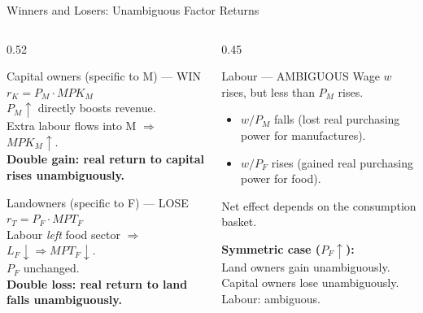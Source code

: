 \documentclass[aspectratio=169]{beamer}
\begin{document}
\begin{frame}{Winners and Losers: Unambiguous Factor Returns}
\begin{columns}[T]
\begin{column}{0.52\textwidth}
\begin{block}{Capital owners (specific to M) --- WIN}
\small$r_K = P_M\cdot MPK_M$\\
$P_M\uparrow$ directly boosts revenue.\\
Extra labour flows into M $\Rightarrow$ $MPK_M\uparrow$.\\
\textbf{Double gain: real return to capital rises
unambiguously.}
\end{block}
\vspace{0.3em}
\begin{block}{Landowners (specific to F) --- LOSE}
\small$r_T = P_F\cdot MPT_F$\\
Labour \emph{left} food sector $\Rightarrow$
$L_F\downarrow\Rightarrow MPT_F\downarrow$.\\
$P_F$ unchanged.\\
\textbf{Double loss: real return to land falls
unambiguously.}
\end{block}
\end{column}
\begin{column}{0.45\textwidth}
\begin{alertblock}{Labour --- AMBIGUOUS}
\small Wage $w$ rises, but less than $P_M$ rises.
\begin{itemize}\small
  \item $w/P_M$ falls (lost real purchasing power for
        manufactures).
  \item $w/P_F$ rises (gained real purchasing power for
        food).
\end{itemize}
Net effect depends on the consumption basket.
\end{alertblock}
\vspace{0.3em}
\begin{varbox}
\footnotesize\textbf{Symmetric case ($P_F\uparrow$):}\\
Land owners gain unambiguously.\\
Capital owners lose unambiguously.\\
Labour: ambiguous.
\end{varbox}
\end{column}
\end{columns}
\end{frame}
\end{document}
